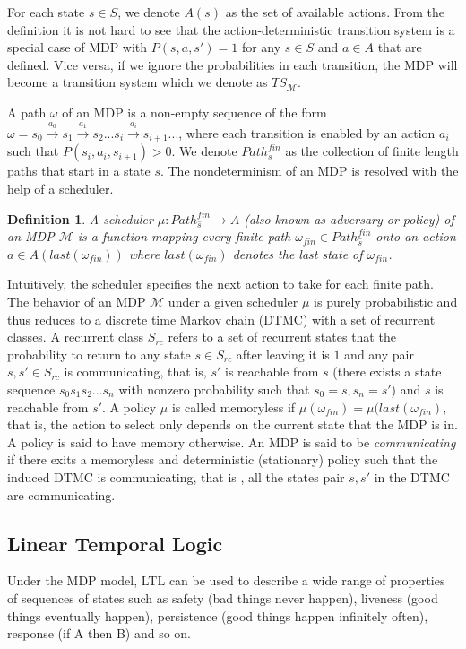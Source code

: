 \documentclass[journal]{IEEEtran}
\newtheorem{definition}{Definition}
\begin{document}
For each state $s\in S$, we denote $A(s)$ as the set of available actions. From the definition it is not hard to see that the action-deterministic transition system is a special case of MDP with $P(s,a,s')=1$ for any $s\in S$ and $a\in A$ that are defined. Vice versa, if we ignore the probabilities in each transition, the MDP will become a transition system which we denote as $TS_\mathcal{M}$. 

A path $\omega$ of an MDP is a non-empty sequence of the form $\omega=s_0\xrightarrow{a_0}s_1\xrightarrow{a_1}s_2...s_i\xrightarrow{a_i}s_{i+1}...$, where each transition is enabled by an action $a_i$ such that $P(s_i,a_i,s_{i+1})>0$. We denote $Path^{fin}_s$ as the collection of finite length paths that start in a state $s$. The nondeterminism of an MDP is resolved with the help of a scheduler.
\begin{definition}
	A scheduler $\mu:Path_{\hat{s}}^{fin}\rightarrow A$ (also known as adversary or policy) of an MDP $\mathcal{M}$ is a function mapping every finite path $\omega_{fin}\in Path_{\hat{s}}^{fin}$ onto an action $a\in A(last(\omega_{fin}))$ where $last(\omega_{fin})$ denotes the last state of $\omega_{fin}$.
\end{definition}
\indent Intuitively, the scheduler specifies the next action to take for each finite path. The behavior of an MDP $\mathcal{M}$ under a given scheduler $\mu$ is purely probabilistic and thus reduces to a discrete time Markov chain (DTMC) with a set of recurrent classes. A recurrent class $S_{rc}$ refers to a set of recurrent states that the probability to return to any state $s\in S_{rc}$ after leaving it is $1$ and any pair $s,s'\in S_{rc}$ is communicating, that is,  $s'$ is reachable from $s$ (there exists a state sequence $s_0s_1s_2...s_n$ with nonzero probability such that $s_0=s,s_n=s'$) and $s$ is reachable from $s'$.  %
A policy $\mu$ is called memoryless if $\mu(\omega_{fin})=\mu(last(\omega_{fin})$, that is, the action to select only depends on the current state that the MDP is in. A policy is said to have memory otherwise. An MDP is said to be \emph{communicating} \cite{puterman2014markov} if there exits a memoryless and deterministic (stationary) policy such that the induced DTMC is communicating, that is , all the states pair $s,s'$ in the DTMC are communicating.   
\subsection{Linear Temporal Logic}
Under the MDP model, LTL  can be used to describe a wide range of properties of sequences of states such as safety (bad things never happen), liveness (good things eventually happen), persistence (good things happen infinitely often), response (if A then B) and so on. 
\end{document}
